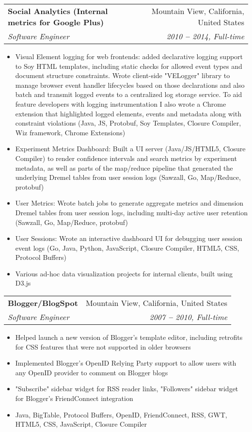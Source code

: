 \documentclass[letterpaper,11pt]{article}
\makeatletter
\newcommand{\resumeItem}[1]{
  \item\small{
    {#1 \vspace{-2pt}}
  }
}
\newcommand{\resumeSubheading}[4]{
  \vspace{-2pt}\item
    \begin{tabular*}{0.97\textwidth}[t]{l@{\extracolsep{\fill}}r}
      \textbf{#1} & #2 \\
      \textit{\small#3} & \textit{\small #4} \\
    \end{tabular*}\vspace{-7pt}
}
\newcommand{\resumeItemListStart}{\begin{itemize}}
\newcommand{\resumeItemListEnd}{\end{itemize}\vspace{-5pt}}
\makeatother
\begin{document}
    \resumeSubheading
    {Social Analytics (Internal metrics for Google Plus)}{Mountain View, California, United States}
    {Software Engineer}{2010 \textbf{--} 2014, Full-time}
        \resumeItemListStart
            \resumeItem{Visual Element logging for web frontends: added declarative logging support to Soy HTML templates, including static checks for allowed event types and document structure constraints. 
            Wrote client-side "VELogger" library to manage browser event handler lifecycles based on those declarations and also batch and transmit logged events to a centralized log storage service. 
            To aid feature developers with logging instrumentation I also wrote a Chrome extension that highlighted logged elements, events and metadata along with constraint violations (Java, JS, Protobuf, Soy Templates, Closure Compiler, Wiz framework, Chrome Extensions)}
            \resumeItem{Experiment Metrics Dashboard: Built a UI server (Java/JS/HTML5, Closure Compiler) to render confidence intervals and search metrics by experiment metadata, 
            as well as parts of the map/reduce pipeline that generated the underlying Dremel tables from user session logs (Sawzall, Go, Map/Reduce, protobuf)}
            \resumeItem{User Metrics: Wrote batch jobs to generate aggregate metrics and dimension Dremel tables from user session logs, including multi-day active user retention (Sawzall, Go, Map/Reduce, protobuf) }
            \resumeItem{User Sessions: Wrote an interactive dashboard UI for debugging user session event logs (Go, Java, Python, JavaScript, Closure Compiler, HTML5, CSS, Protocol Buffers)}
            \resumeItem{Various ad-hoc data visualization projects for internal clients, built using D3.js }
        \resumeItemListEnd
  
    \resumeSubheading
    {Blogger/BlogSpot}{Mountain View, California, United States}
    {Software Engineer}{2007 \textbf{--} 2010, Full-time}
        \resumeItemListStart
          \resumeItem{Helped launch a new version of Blogger's template editor, including retrofits for CSS features that were not supported in older browsers}
          \resumeItem{Implemented Blogger's OpenID Relying Party support to allow users with any OpenID provider to comment on Blogger blogs}
          \resumeItem{"Subscribe" sidebar widget for RSS reader links, "Followers" sidebar widget for Blogger's FriendConnect integration}
          \resumeItem{Java, BigTable, Protocol Buffers, OpenID, FriendConnect, RSS, GWT, HTML5, CSS, JavaScript, Closure Compiler}
        \resumeItemListEnd
    
\end{document}
